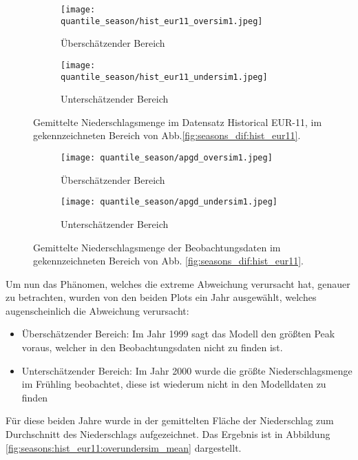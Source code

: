 \begin{figure}[h]
	\begin{subfigure}{0.49\textwidth}
		\texttt{[image: quantile\_season/hist\_eur11\_oversim1.jpeg]}
		\caption{Überschätzender Bereich}
		\label{fig:season:over_hist}
	\end{subfigure}
	\begin{subfigure}{0.49\textwidth}
	\texttt{[image: quantile\_season/hist\_eur11\_undersim1.jpeg]}
	\caption{Unterschätzender Bereich}
	\label{fig:season:under_hist}
	\end{subfigure}
	\caption{Gemittelte Niederschlagsmenge im Datensatz Historical EUR-11, im gekennzeichneten Bereich von Abb.\ref{fig:seasons_dif:hist_eur11}.}
\end{figure}
\begin{figure}[h]
	\begin{subfigure}{0.49\textwidth}
		\texttt{[image: quantile\_season/apgd\_oversim1.jpeg]}
		\caption{Überschätzender Bereich}
		\label{fig:season:over_apgd}
	\end{subfigure}
	\begin{subfigure}{0.49\textwidth}
		\texttt{[image: quantile\_season/apgd\_undersim1.jpeg]}
		\caption{Unterschätzender Bereich}
	\label{fig:season:under_apgd}
	\end{subfigure}
	\caption{Gemittelte Niederschlagsmenge der Beobachtungsdaten im gekennzeichneten Bereich von Abb. \ref{fig:seasons_dif:hist_eur11}.}
\end{figure}

Um nun das Phänomen, welches die extreme Abweichung verursacht hat, genauer zu betrachten, wurden von den beiden Plots ein Jahr ausgewählt, welches augenscheinlich die Abweichung verursacht:
\begin{itemize}
	\item Überschätzender Bereich: Im Jahr 1999 sagt das Modell den größten Peak voraus, welcher in den Beobachtungsdaten nicht zu finden ist.
	\item Unterschätzender Bereich: Im Jahr 2000 wurde die größte Niederschlagsmenge im Frühling beobachtet, diese ist wiederum nicht in den Modelldaten zu finden
\end{itemize}
Für diese beiden Jahre wurde in der gemittelten Fläche der Niederschlag zum Durchschnitt des Niederschlags aufgezeichnet. Das Ergebnis ist in Abbildung \ref{fig:seasons:hist_eur11:overundersim_mean} dargestellt.\\


